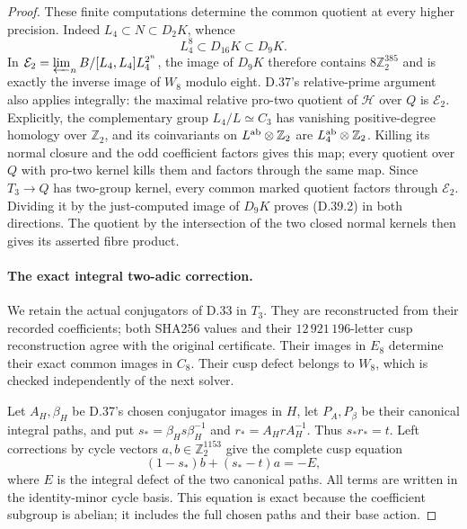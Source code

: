 \begin{proof}
These finite computations determine the common quotient
at every higher precision. Indeed
$L_4\subset N\subset D_2K$, whence
\[
 L_4^8\subset D_{16}K\subset D_9K.                        \tag{D.39.13}
\]
In $\mathcal E_2=\varprojlim_n B/[L_4,L_4]L_4^{2^n}$,
the image of $D_9K$ therefore contains
$8\mathbb Z_2^{385}$ and is exactly the inverse image
of $W_8$ modulo eight. D.37's relative-prime argument
also applies integrally: the maximal relative pro-two
quotient of $\mathcal H$ over $Q$ is $\mathcal E_2$.
Explicitly, the complementary group $L_4/L\simeq C_3$
has vanishing positive-degree homology over $\mathbb Z_2$,
and its coinvariants on $L^{\rm ab}\otimes\mathbb Z_2$
are $L_4^{\rm ab}\otimes\mathbb Z_2$. Killing its normal
closure and the odd coefficient factors gives this map;
every quotient over $Q$ with pro-two kernel kills them
and factors through the same map. Since $T_3\to Q$ has
two-group kernel, every common marked quotient factors
through $\mathcal E_2$. Dividing it by the just-computed
image of $D_9K$ proves (D.39.2) in both directions.
The quotient by the intersection of the two closed
normal kernels then gives its asserted fibre product.

\paragraph{The exact integral two-adic correction.}
We retain the actual conjugators of D.33 in $T_3$.
They are reconstructed from their recorded coefficients;
both SHA256 values and their $12\,921\,196$-letter cusp
reconstruction agree with the original certificate.
Their images in $E_8$ determine their exact common images
in $C_8$. Their cusp defect belongs to $W_8$, which is
checked independently of the next solver.

Let $A_H,\beta_H$ be D.37's chosen conjugator images in
$H$, let $P_A,P_\beta$ be their canonical integral
paths, and put $s_*=\beta_Hs\beta_H^{-1}$ and
$r_*=A_HrA_H^{-1}$. Thus $s_*r_*=t$. Left corrections
by cycle vectors $a,b\in\mathbb Z_2^{1153}$ give the
complete cusp equation
\[
 (1-s_*)b+(s_*-t)a=-E,                                   \tag{D.39.14}
\]
where $E$ is the integral defect of the two canonical
paths. All terms are written in the identity-minor
cycle basis. This equation is exact because the
coefficient subgroup is abelian; it includes the full
chosen paths and their base action.


\end{proof}
